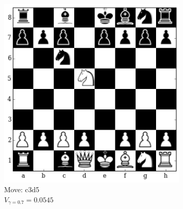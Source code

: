 \begin{figure}[H]
\begin{subfigure}[t]{0.45\textwidth}
    \includegraphics[width=\textwidth]{img/table_evaluations/output_11_2.png}
        \caption{Move: c3d5\\
        $V_{\gamma=0.7}=0.0545$}
    \end{subfigure}
   \hspace{1em}
  \centering
    \begin{subfigure}[t]{0.45\textwidth}
        \centering
        

\end{subfigure}
\end{figure}
